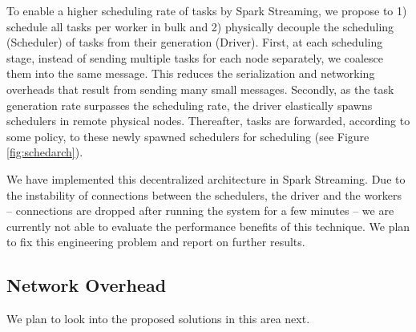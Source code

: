 To enable a higher scheduling rate of tasks by Spark Streaming, we propose to 1) schedule all tasks per worker in bulk and 2) physically decouple the scheduling (Scheduler) of tasks from their generation (Driver).
First, at each scheduling stage, instead of sending multiple tasks for each node separately, we coalesce them into the same message. This reduces the serialization and networking overheads that result from sending many small messages.
Secondly, as the task generation rate surpasses the scheduling rate, the driver elastically spawns schedulers in remote physical nodes. Thereafter, tasks are forwarded, according to some policy, to these newly spawned schedulers for scheduling (see Figure \ref{fig:schedarch}). 

We have implemented this decentralized architecture in Spark Streaming. Due to the instability of connections between the schedulers, the driver and the workers -- connections are dropped after running the system for a few minutes -- we are currently not able to evaluate the performance benefits of this technique. We plan to fix this engineering problem and report on further results.

\subsection{Network Overhead}
We plan to look into the proposed solutions in this area next.
